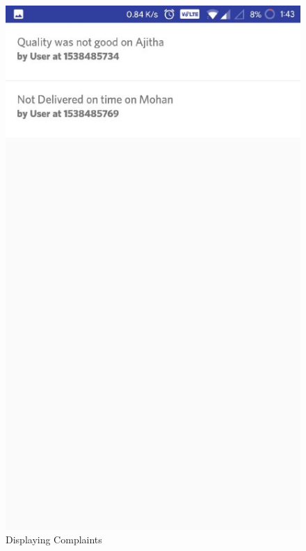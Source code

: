\begin{figure}[h]
  \begin{center}
\includegraphics[scale=0.6]{3/fourteen.jpeg}
\caption{Displaying Complaints}
\label{fig:two}
\end{center}
\end{figure}







